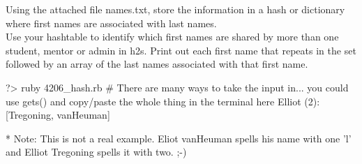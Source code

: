 \documentclass{42-en}
\begin{document}
Using the attached file names.txt, store the information in a hash or dictionary where first names are associated with last names.\\

Use your hashtable to identify which first names are shared by more than one student, mentor or admin in h2s. Print out each first name that repeats in the set followed by an array of the last names associated with that first name.

\begin{42console}
	?> ruby 4206_hash.rb
	# There are many ways to take the input in... you could use gets() and copy/paste the whole thing in the terminal here
	Elliot (2): [Tregoning, vanHeuman]
\end{42console}

* Note: This is not a real example. Eliot vanHeuman spells his name with one 'l' and Elliot Tregoning spells it with two. ;-)






\end{document}
